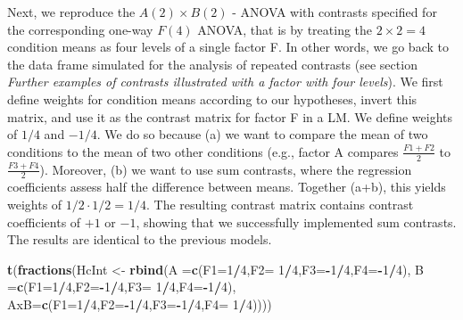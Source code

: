 \documentclass[12pt,]{krantz}
\newenvironment{Shaded}{\begin{snugshade}}{\end{snugshade}}
\newcommand{\KeywordTok}[1]{\textcolor[rgb]{0.13,0.29,0.53}{\textbf{#1}}}
\newcommand{\DataTypeTok}[1]{\textcolor[rgb]{0.13,0.29,0.53}{#1}}
\newcommand{\DecValTok}[1]{\textcolor[rgb]{0.00,0.00,0.81}{#1}}
\newcommand{\StringTok}[1]{\textcolor[rgb]{0.31,0.60,0.02}{#1}}
\newcommand{\OperatorTok}[1]{\textcolor[rgb]{0.81,0.36,0.00}{\textbf{#1}}}
\newcommand{\NormalTok}[1]{#1}
\theoremstyle{definition}
\theoremstyle{definition}
\theoremstyle{definition}
\theoremstyle{remark}
\begin{document}
Next, we reproduce the \(A(2) \times B(2)\) - ANOVA with contrasts
specified for the corresponding one-way \(F(4)\) ANOVA, that is by
treating the \(2 \times 2 = 4\) condition means as four levels of a
single factor F. In other words, we go back to the data frame simulated
for the analysis of repeated contrasts (see section \emph{Further
examples of contrasts illustrated with a factor with four levels}). We
first define weights for condition means according to our hypotheses,
invert this matrix, and use it as the contrast matrix for factor F in a
LM. We define weights of \(1/4\) and \(-1/4\). We do so because (a) we
want to compare the mean of two conditions to the mean of two other
conditions (e.g., factor A compares \(\frac{F1 + F2}{2}\) to
\(\frac{F3 + F4}{2}\)). Moreover, (b) we want to use sum contrasts,
where the regression coefficients assess half the difference between
means. Together (a+b), this yields weights of \(1/2 \cdot 1/2 = 1/4\).
The resulting contrast matrix contains contrast coefficients of \(+1\)
or \(-1\), showing that we successfully implemented sum contrasts. The
results are identical to the previous models.

\begin{Shaded}
\begin{Highlighting}[]
\KeywordTok{t}\NormalTok{(}\KeywordTok{fractions}\NormalTok{(HcInt <-}\StringTok{ }\KeywordTok{rbind}\NormalTok{(}\DataTypeTok{A  =}\KeywordTok{c}\NormalTok{(}\DataTypeTok{F1=}\DecValTok{1}\OperatorTok{/}\DecValTok{4}\NormalTok{,}\DataTypeTok{F2=} \DecValTok{1}\OperatorTok{/}\DecValTok{4}\NormalTok{,}\DataTypeTok{F3=}\OperatorTok{-}\DecValTok{1}\OperatorTok{/}\DecValTok{4}\NormalTok{,}\DataTypeTok{F4=}\OperatorTok{-}\DecValTok{1}\OperatorTok{/}\DecValTok{4}\NormalTok{),}
                           \DataTypeTok{B  =}\KeywordTok{c}\NormalTok{(}\DataTypeTok{F1=}\DecValTok{1}\OperatorTok{/}\DecValTok{4}\NormalTok{,}\DataTypeTok{F2=}\OperatorTok{-}\DecValTok{1}\OperatorTok{/}\DecValTok{4}\NormalTok{,}\DataTypeTok{F3=} \DecValTok{1}\OperatorTok{/}\DecValTok{4}\NormalTok{,}\DataTypeTok{F4=}\OperatorTok{-}\DecValTok{1}\OperatorTok{/}\DecValTok{4}\NormalTok{),}
                           \DataTypeTok{AxB=}\KeywordTok{c}\NormalTok{(}\DataTypeTok{F1=}\DecValTok{1}\OperatorTok{/}\DecValTok{4}\NormalTok{,}\DataTypeTok{F2=}\OperatorTok{-}\DecValTok{1}\OperatorTok{/}\DecValTok{4}\NormalTok{,}\DataTypeTok{F3=}\OperatorTok{-}\DecValTok{1}\OperatorTok{/}\DecValTok{4}\NormalTok{,}\DataTypeTok{F4=} \DecValTok{1}\OperatorTok{/}\DecValTok{4}\NormalTok{))))}
\end{Highlighting}
\end{Shaded}
\end{document}
